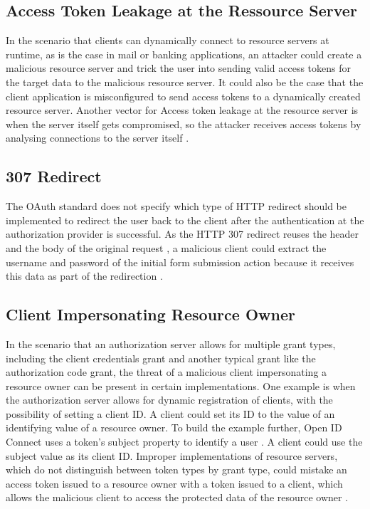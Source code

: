 \documentclass[
    fontsize=12pt,
    headings=small,
    parskip=half,           %
    bibliography=totoc,
    numbers=noenddot,       %
    open=any,               %
    ]{scrreprt}
\begin{document}
\subsection{Access Token Leakage at the Ressource Server}
In the scenario that clients can dynamically connect to resource servers at runtime, as is the case in mail or banking applications, an attacker could create a malicious resource server and trick the user into sending valid access tokens for the target data to the malicious resource server. It could also be the case that the client application is misconfigured to send access tokens to a dynamically created resource server. Another vector for Access token leakage at the resource server is when the server itself gets compromised, so the attacker receives access tokens by analysing connections to the server itself \cite{lodderstedt2020oauth}.

\subsection{307 Redirect}
The OAuth standard does not specify which type of HTTP redirect should be implemented to redirect the user back to the client after the authentication at the authorization provider is successful. As the HTTP 307 redirect reuses the header and the body of the original request \cite{fielding1999rfc2616}, a malicious client could extract the username and password of the initial form submission action because it receives this data as part of the redirection \cite{fett2016comprehensive}.

\subsection{Client Impersonating Resource Owner}
In the scenario that an authorization server allows for multiple grant types, including the client credentials grant and another typical grant like the authorization code grant, the threat of a malicious client impersonating a resource owner can be present in certain implementations. One example is when the authorization server allows for dynamic registration of clients, with the possibility of setting a client ID. A client could set its ID to the value of an identifying value of a resource owner. To build the example further, Open ID Connect uses a token's subject property to identify a user \cite{sakimura2014openid}. A client could use the subject value as its client ID. Improper implementations of resource servers, which do not distinguish between token types by grant type, could mistake an access token issued to a resource owner with a token issued to a client, which allows the malicious client to access the protected data of the resource owner \cite{lodderstedt2020oauth}.
\end{document}
